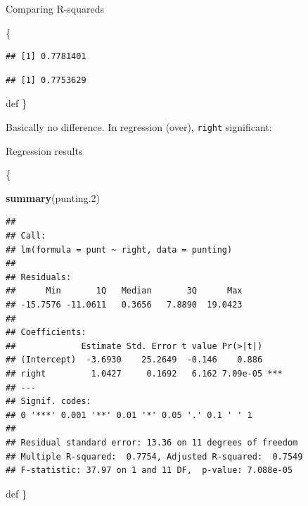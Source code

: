\documentclass[ignorenonframetext,]{beamer}
\newenvironment{Shaded}{\begin{snugshade}}{\end{snugshade}}
\newcommand{\FloatTok}[1]{\textcolor[rgb]{0.00,0.00,0.81}{#1}}
\newcommand{\KeywordTok}[1]{\textcolor[rgb]{0.13,0.29,0.53}{\textbf{#1}}}
\newcommand{\NormalTok}[1]{#1}
\newcommand{\OperatorTok}[1]{\textcolor[rgb]{0.81,0.36,0.00}{\textbf{#1}}}
\begin{document}
\begin{frame}[fragile]{Comparing R-squareds}
\protect\hypertarget{comparing-r-squareds}{}

\{\small

\begin{Shaded}
\end{Shaded}

\begin{verbatim}
## [1] 0.7781401
\end{verbatim}

\begin{Shaded}
\end{Shaded}

\begin{verbatim}
## [1] 0.7753629
\end{verbatim}

def \}

Basically no difference. In regression (over), \texttt{right}
significant:

\end{frame}

\begin{frame}[fragile]{Regression results}
\protect\hypertarget{regression-results}{}

\{\footnotesize

\begin{Shaded}
\begin{Highlighting}[]
\KeywordTok{summary}\NormalTok{(punting}\FloatTok{.2}\NormalTok{)}
\end{Highlighting}
\end{Shaded}

\begin{verbatim}
## 
## Call:
## lm(formula = punt ~ right, data = punting)
## 
## Residuals:
##      Min       1Q   Median       3Q      Max 
## -15.7576 -11.0611   0.3656   7.8890  19.0423 
## 
## Coefficients:
##             Estimate Std. Error t value Pr(>|t|)    
## (Intercept)  -3.6930    25.2649  -0.146    0.886    
## right         1.0427     0.1692   6.162 7.09e-05 ***
## ---
## Signif. codes:  
## 0 '***' 0.001 '**' 0.01 '*' 0.05 '.' 0.1 ' ' 1
## 
## Residual standard error: 13.36 on 11 degrees of freedom
## Multiple R-squared:  0.7754, Adjusted R-squared:  0.7549 
## F-statistic: 37.97 on 1 and 11 DF,  p-value: 7.088e-05
\end{verbatim}

def \}

\end{frame}
\end{document}
